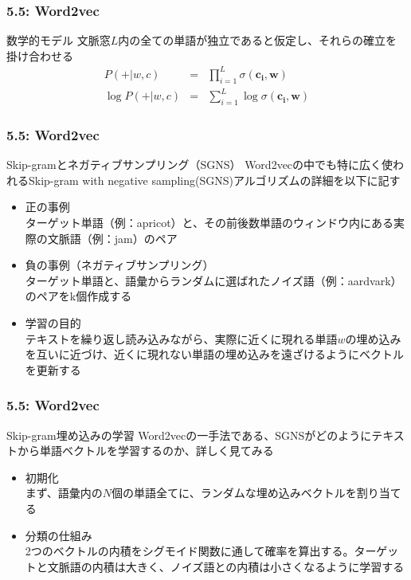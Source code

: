 \documentclass[unicode,11pt]{beamer} %
\begin{document}
\begin{frame}
    \frametitle{5.5: Word2vec}
    \begin{alertblock}{数学的モデル}
        文脈窓$L$内の全ての単語が独立であると仮定し、それらの確立を掛け合わせる
        \begin{eqnarray*}
            P(+|w, c) &=& \prod_{i=1}^L \sigma(\boldsymbol{c_i}, \boldsymbol{w}) \\
            \log P(+|w, c) &=& \sum_{i=1}^L \log \sigma(\boldsymbol{c_i}, \boldsymbol{w})
        \end{eqnarray*}
    \end{alertblock}
\end{frame}

\begin{frame}
    \frametitle{5.5: Word2vec}
    \begin{alertblock}{Skip-gramとネガティブサンプリング（SGNS）}
        Word2vecの中でも特に広く使われるSkip-gram with negative sampling(SGNS)アルゴリズムの詳細を以下に記す
        \begin{itemize}
            \item 正の事例\\ターゲット単語（例：apricot）と、その前後数単語のウィンドウ内にある実際の文脈語（例：jam）のペア
            \item 負の事例（ネガティブサンプリング）\\ターゲット単語と、語彙からランダムに選ばれたノイズ語（例：aardvark）のペアをk個作成する
            \item 学習の目的\\テキストを繰り返し読み込みながら、実際に近くに現れる単語$w$の埋め込みを互いに近づけ、近くに現れない単語の埋め込みを遠ざけるようにベクトルを更新する
        \end{itemize}
    \end{alertblock}
\end{frame}

\begin{frame}
    \frametitle{5.5: Word2vec}
    \begin{alertblock}{Skip-gram埋め込みの学習}
        Word2vecの一手法である、SGNSがどのようにテキストから単語ベクトルを学習するのか、詳しく見てみる
        \begin{itemize}
            \item 初期化\\まず、語彙内の$N$個の単語全てに、ランダムな埋め込みベクトルを割り当てる
            \item 分類の仕組み\\2つのベクトルの内積をシグモイド関数に通して確率を算出する。ターゲットと文脈語の内積は大きく、ノイズ語との内積は小さくなるように学習する
        \end{itemize}
    \end{alertblock}
\end{frame}
\end{document}
